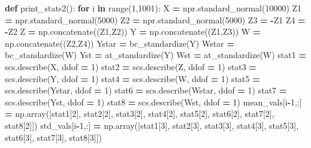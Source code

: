 \documentclass[
]{book}
\newenvironment{Shaded}{\begin{snugshade}}{\end{snugshade}}
\newcommand{\BuiltInTok}[1]{#1}
\newcommand{\ControlFlowTok}[1]{\textcolor[rgb]{0.13,0.29,0.53}{\textbf{#1}}}
\newcommand{\DecValTok}[1]{\textcolor[rgb]{0.00,0.00,0.81}{#1}}
\newcommand{\KeywordTok}[1]{\textcolor[rgb]{0.13,0.29,0.53}{\textbf{#1}}}
\newcommand{\NormalTok}[1]{#1}
\newcommand{\OperatorTok}[1]{\textcolor[rgb]{0.81,0.36,0.00}{\textbf{#1}}}
\begin{document}
\begin{Shaded}
\begin{Highlighting}[]
\KeywordTok{def}\NormalTok{ print\_stats2():}
  \ControlFlowTok{for}\NormalTok{ i }\KeywordTok{in} \BuiltInTok{range}\NormalTok{(}\DecValTok{1}\NormalTok{,}\DecValTok{1001}\NormalTok{):}
\NormalTok{    X }\OperatorTok{=}\NormalTok{ npr.standard\_normal(}\DecValTok{10000}\NormalTok{)}
\NormalTok{    Z1 }\OperatorTok{=}\NormalTok{ npr.standard\_normal(}\DecValTok{5000}\NormalTok{)}
\NormalTok{    Z2 }\OperatorTok{=}\NormalTok{ npr.standard\_normal(}\DecValTok{5000}\NormalTok{)}
\NormalTok{    Z3 }\OperatorTok{=} \OperatorTok{{-}}\NormalTok{Z1}
\NormalTok{    Z4 }\OperatorTok{=} \OperatorTok{{-}}\NormalTok{Z2}
\NormalTok{    Z }\OperatorTok{=}\NormalTok{ np.concatenate((Z1,Z2))}
\NormalTok{    Y }\OperatorTok{=}\NormalTok{ np.concatenate((Z1,Z3))}
\NormalTok{    W }\OperatorTok{=}\NormalTok{ np.concatenate((Z2,Z4))}
\NormalTok{    Ystar }\OperatorTok{=}\NormalTok{ bc\_standardize(Y)}
\NormalTok{    Wstar }\OperatorTok{=}\NormalTok{ bc\_standardize(W)}
\NormalTok{    Yst }\OperatorTok{=}\NormalTok{ at\_standardize(Y)}
\NormalTok{    Wst }\OperatorTok{=}\NormalTok{ at\_standardize(W)}
\NormalTok{    stat1 }\OperatorTok{=}\NormalTok{ scs.describe(X, ddof }\OperatorTok{=} \DecValTok{1}\NormalTok{)}
\NormalTok{    stat2 }\OperatorTok{=}\NormalTok{ scs.describe(Z, ddof }\OperatorTok{=} \DecValTok{1}\NormalTok{)}
\NormalTok{    stat3 }\OperatorTok{=}\NormalTok{ scs.describe(Y, ddof }\OperatorTok{=} \DecValTok{1}\NormalTok{)}
\NormalTok{    stat4 }\OperatorTok{=}\NormalTok{ scs.describe(W, ddof }\OperatorTok{=} \DecValTok{1}\NormalTok{)}
\NormalTok{    stat5 }\OperatorTok{=}\NormalTok{ scs.describe(Ystar, ddof }\OperatorTok{=} \DecValTok{1}\NormalTok{)}
\NormalTok{    stat6 }\OperatorTok{=}\NormalTok{ scs.describe(Wstar, ddof }\OperatorTok{=} \DecValTok{1}\NormalTok{)}
\NormalTok{    stat7 }\OperatorTok{=}\NormalTok{ scs.describe(Yst, ddof }\OperatorTok{=} \DecValTok{1}\NormalTok{)}
\NormalTok{    stat8 }\OperatorTok{=}\NormalTok{ scs.describe(Wst, ddof }\OperatorTok{=} \DecValTok{1}\NormalTok{)}
\NormalTok{    mean\_vals[i}\OperatorTok{{-}}\DecValTok{1}\NormalTok{,:] }\OperatorTok{=}\NormalTok{ np.array([stat1[}\DecValTok{2}\NormalTok{], stat2[}\DecValTok{2}\NormalTok{], stat3[}\DecValTok{2}\NormalTok{], stat4[}\DecValTok{2}\NormalTok{], stat5[}\DecValTok{2}\NormalTok{], stat6[}\DecValTok{2}\NormalTok{], stat7[}\DecValTok{2}\NormalTok{], stat8[}\DecValTok{2}\NormalTok{]])}
\NormalTok{    std\_vals[i}\OperatorTok{{-}}\DecValTok{1}\NormalTok{,:] }\OperatorTok{=}\NormalTok{ np.array([stat1[}\DecValTok{3}\NormalTok{], stat2[}\DecValTok{3}\NormalTok{], stat3[}\DecValTok{3}\NormalTok{], stat4[}\DecValTok{3}\NormalTok{], stat5[}\DecValTok{3}\NormalTok{], stat6[}\DecValTok{3}\NormalTok{], stat7[}\DecValTok{3}\NormalTok{], stat8[}\DecValTok{3}\NormalTok{]])}

\end{Highlighting}
\end{Shaded}
\end{document}

